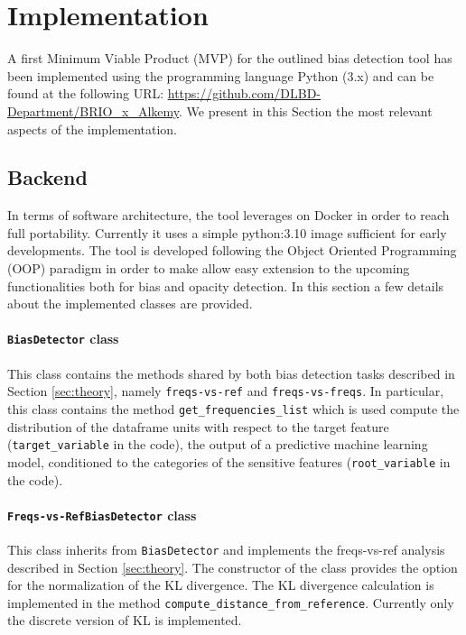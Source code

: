 \documentclass[
]{ceurart}
\begin{document}
\section{Implementation}
\label{sec:implementation}

A first Minimum Viable Product (MVP) for the outlined bias detection tool has been implemented using the programming language Python (3.x) and can be found at the following URL: \url{https://github.com/DLBD-Department/BRIO_x_Alkemy}. We present in this Section the most relevant aspects of the implementation.

\subsection{Backend}
\label{subsec:backend}

In terms of software architecture, the tool leverages on Docker in order to reach full portability. Currently it uses a simple python:3.10 image sufficient for early developments. The tool is developed following the Object Oriented Programming (OOP) paradigm in order to make allow easy extension to the upcoming functionalities both for bias and opacity detection. In this section a few details about the implemented classes are provided. 

\paragraph{\texttt{BiasDetector} class}

This class contains the methods shared by both bias detection tasks described in Section \ref{sec:theory}, namely \texttt{freqs-vs-ref} and \texttt{freqs-vs-freqs}. In particular, this class contains the method \texttt{get\_frequencies\_list} which is used compute the distribution of the dataframe units with respect to the target feature (\texttt{target\_variable} in the code), the output of a predictive machine learning model, conditioned to the categories of the sensitive features (\texttt{root\_variable} in the code). 

\paragraph{\texttt{Freqs-vs-RefBiasDetector} class}
This class inherits from \texttt{BiasDetector} and implements the freqs-vs-ref analysis described in Section \ref{sec:theory}. The constructor of the class provides the option for the normalization of the KL divergence. The KL divergence calculation is implemented in the method \texttt{compute\_distance\_from\_reference}. Currently only the discrete version of KL is implemented. 
\end{document}
